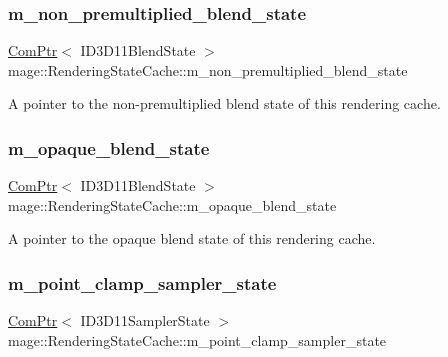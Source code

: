\subsubsection{\texorpdfstring{m\+\_\+non\+\_\+premultiplied\+\_\+blend\+\_\+state}{m\_non\_premultiplied\_blend\_state}}
{\footnotesize\ttfamily \hyperlink{namespacemage_ae74f374780900893caa5555d1031fd79}{Com\+Ptr}$<$ I\+D3\+D11\+Blend\+State $>$ mage\+::\+Rendering\+State\+Cache\+::m\+\_\+non\+\_\+premultiplied\+\_\+blend\+\_\+state\hspace{0.3cm}{\ttfamily [private]}}

A pointer to the non-\/premultiplied blend state of this rendering cache. \hypertarget{structmage_1_1_rendering_state_cache_ac655dae04386c2998677dff61704c975}{}\label{structmage_1_1_rendering_state_cache_ac655dae04386c2998677dff61704c975} 
\subsubsection{\texorpdfstring{m\+\_\+opaque\+\_\+blend\+\_\+state}{m\_opaque\_blend\_state}}
{\footnotesize\ttfamily \hyperlink{namespacemage_ae74f374780900893caa5555d1031fd79}{Com\+Ptr}$<$ I\+D3\+D11\+Blend\+State $>$ mage\+::\+Rendering\+State\+Cache\+::m\+\_\+opaque\+\_\+blend\+\_\+state\hspace{0.3cm}{\ttfamily [private]}}

A pointer to the opaque blend state of this rendering cache. \hypertarget{structmage_1_1_rendering_state_cache_ad53e96f5527120d6cfed5a4759dc0d41}{}\label{structmage_1_1_rendering_state_cache_ad53e96f5527120d6cfed5a4759dc0d41} 
\subsubsection{\texorpdfstring{m\+\_\+point\+\_\+clamp\+\_\+sampler\+\_\+state}{m\_point\_clamp\_sampler\_state}}
{\footnotesize\ttfamily \hyperlink{namespacemage_ae74f374780900893caa5555d1031fd79}{Com\+Ptr}$<$ I\+D3\+D11\+Sampler\+State $>$ mage\+::\+Rendering\+State\+Cache\+::m\+\_\+point\+\_\+clamp\+\_\+sampler\+\_\+state\hspace{0.3cm}{\ttfamily [private]}}

